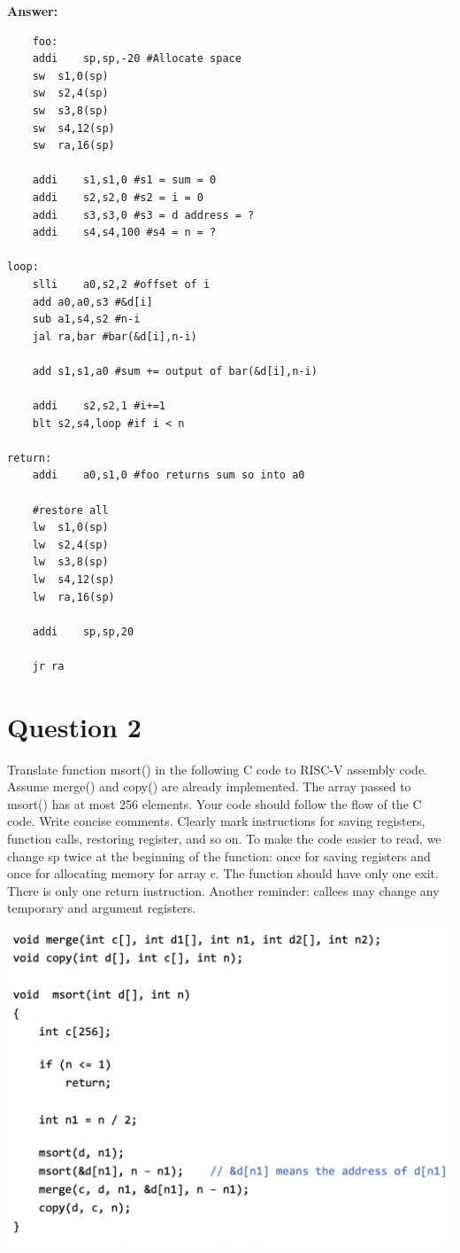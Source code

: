 \documentclass{article}
\begin{document}
\textbf{Answer:}
\begin{lstlisting}
    foo:
	addi	sp,sp,-20 #Allocate space 
	sw	s1,0(sp)
	sw	s2,4(sp)
	sw	s3,8(sp)
	sw	s4,12(sp)
	sw	ra,16(sp)
	
	addi	s1,s1,0 #s1 = sum = 0
	addi	s2,s2,0 #s2 = i = 0
	addi	s3,s3,0 #s3 = d address = ? 
	addi	s4,s4,100 #s4 = n = ? 
	
loop:	
	slli	a0,s2,2 #offset of i
	add	a0,a0,s3 #&d[i]
	sub	a1,s4,s2 #n-i
	jal	ra,bar #bar(&d[i],n-i)
	
	add	s1,s1,a0 #sum += output of bar(&d[i],n-i)
	
	addi	s2,s2,1 #i+=1
	blt	s2,s4,loop #if i < n

return:
	addi	a0,s1,0 #foo returns sum so into a0

	#restore all
	lw	s1,0(sp)
	lw	s2,4(sp)
	lw	s3,8(sp)
	lw	s4,12(sp)
	lw	ra,16(sp)
	
	addi	sp,sp,20
	
	jr ra
\end{lstlisting}

\section*{Question 2}
Translate function msort() in the following C code to RISC-V assembly code. Assume
merge() and copy() are already implemented. The array passed to msort() has at most 256
elements.
Your code should follow the flow of the C code. Write concise comments. Clearly mark
instructions for saving registers, function calls, restoring register, and so on.
To make the code easier to read, we change sp twice at the beginning of the function: once
for saving registers and once for allocating memory for array c.
The function should have only one exit. There is only one return instruction.
Another reminder: callees may change any temporary and argument registers.

\begin{center}
    \includegraphics[scale=.55]{images/Q2.png}
\end{center}
\end{document}
